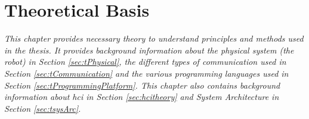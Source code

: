 \chapter{Theoretical Basis}
\textit{This chapter provides necessary theory to understand principles and methods used in the thesis. It provides background information about the physical system  (the robot) in Section \ref{sec:tPhysical}, the different types of communication used in Section \ref{sec:tCommunication} and the various programming languages used in Section \ref{sec:tProgrammingPlatform}. This chapter also contains background information about \acrfull{hci} in Section \ref{sec:hcitheory} and System Architecture in Section \ref{sec:tsysArc}.}




